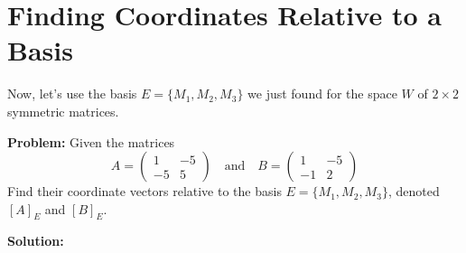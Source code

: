 \documentclass[11pt]{article}
\theoremstyle{definition}
\theoremstyle{remark}
\newcommand{\mat}[1]{\begin{pmatrix}#1\end{pmatrix}}
\begin{document}
\section{Finding Coordinates Relative to a Basis}

Now, let's use the basis $E = \{M_1, M_2, M_3\}$ we just found for the space $W$ of $2 \times 2$ symmetric matrices.

\textbf{Problem:}
Given the matrices
\[ A = \mat{1 & -5 \\ -5 & 5} \quad \text{and} \quad B = \mat{1 & -5 \\ -1 & 2} \]
Find their coordinate vectors relative to the basis $E = \{M_1, M_2, M_3\}$, denoted $[A]_E$ and $[B]_E$.

\textbf{Solution:}
\end{document}
